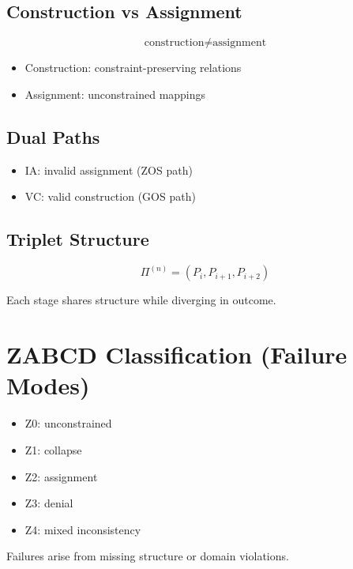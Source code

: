 \documentclass[11pt]{article}
\begin{document}
\subsection{Construction vs Assignment}

\begin{equation}
\text{construction} \neq \text{assignment}
\end{equation}

\begin{itemize}
\item Construction: constraint-preserving relations
\item Assignment: unconstrained mappings
\end{itemize}

\subsection{Dual Paths}

\begin{itemize}
\item IA: invalid assignment (ZOS path)
\item VC: valid construction (GOS path)
\end{itemize}

\subsection{Triplet Structure}

\begin{equation}
\Pi^{(n)} = (P_i, P_{i+1}, P_{i+2})
\end{equation}

Each stage shares structure while diverging in outcome.

\section{ZABCD Classification (Failure Modes)}

\begin{itemize}
\item Z0: unconstrained
\item Z1: collapse
\item Z2: assignment
\item Z3: denial
\item Z4: mixed inconsistency
\end{itemize}

Failures arise from missing structure or domain violations.
\end{document}
